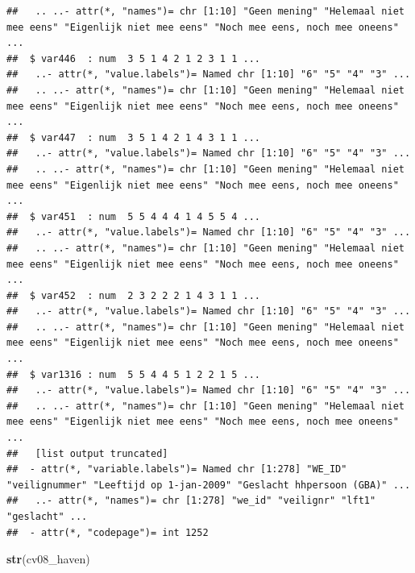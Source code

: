 \documentclass[
]{book}
\newenvironment{Shaded}{\begin{snugshade}}{\end{snugshade}}
\newcommand{\KeywordTok}[1]{\textcolor[rgb]{0.13,0.29,0.53}{\textbf{#1}}}
\newcommand{\NormalTok}[1]{#1}
\begin{document}
\begin{verbatim}
##   .. ..- attr(*, "names")= chr [1:10] "Geen mening" "Helemaal niet mee eens" "Eigenlijk niet mee eens" "Noch mee eens, noch mee oneens" ...
##  $ var446  : num  3 5 1 4 2 1 2 3 1 1 ...
##   ..- attr(*, "value.labels")= Named chr [1:10] "6" "5" "4" "3" ...
##   .. ..- attr(*, "names")= chr [1:10] "Geen mening" "Helemaal niet mee eens" "Eigenlijk niet mee eens" "Noch mee eens, noch mee oneens" ...
##  $ var447  : num  3 5 1 4 2 1 4 3 1 1 ...
##   ..- attr(*, "value.labels")= Named chr [1:10] "6" "5" "4" "3" ...
##   .. ..- attr(*, "names")= chr [1:10] "Geen mening" "Helemaal niet mee eens" "Eigenlijk niet mee eens" "Noch mee eens, noch mee oneens" ...
##  $ var451  : num  5 5 4 4 4 1 4 5 5 4 ...
##   ..- attr(*, "value.labels")= Named chr [1:10] "6" "5" "4" "3" ...
##   .. ..- attr(*, "names")= chr [1:10] "Geen mening" "Helemaal niet mee eens" "Eigenlijk niet mee eens" "Noch mee eens, noch mee oneens" ...
##  $ var452  : num  2 3 2 2 2 1 4 3 1 1 ...
##   ..- attr(*, "value.labels")= Named chr [1:10] "6" "5" "4" "3" ...
##   .. ..- attr(*, "names")= chr [1:10] "Geen mening" "Helemaal niet mee eens" "Eigenlijk niet mee eens" "Noch mee eens, noch mee oneens" ...
##  $ var1316 : num  5 5 4 4 5 1 2 2 1 5 ...
##   ..- attr(*, "value.labels")= Named chr [1:10] "6" "5" "4" "3" ...
##   .. ..- attr(*, "names")= chr [1:10] "Geen mening" "Helemaal niet mee eens" "Eigenlijk niet mee eens" "Noch mee eens, noch mee oneens" ...
##   [list output truncated]
##  - attr(*, "variable.labels")= Named chr [1:278] "WE_ID" "veilignummer" "Leeftijd op 1-jan-2009" "Geslacht hhpersoon (GBA)" ...
##   ..- attr(*, "names")= chr [1:278] "we_id" "veilignr" "lft1" "geslacht" ...
##  - attr(*, "codepage")= int 1252
\end{verbatim}

\begin{Shaded}
\begin{Highlighting}[numbers=left,,]
\KeywordTok{str}\NormalTok{(cv08_haven)}
\end{Highlighting}
\end{Shaded}
\end{document}
